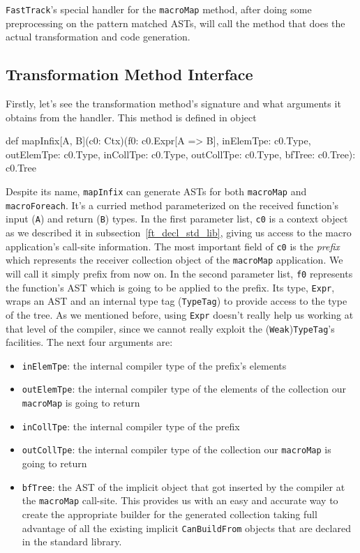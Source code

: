 \texttt{FastTrack}'s special handler for the \texttt{macroMap} method, after
doing some preprocessing on the pattern matched ASTs, will call the method
that does the actual transformation and code generation. 


\subsection{Transformation Method Interface}

Firstly, let's see the transformation method's signature and what arguments it
obtains from the handler. This method is defined in
 object 

\begin{scalaCode}
def mapInfix[A, B](c0: Ctx)(f0: c0.Expr[A => B], inElemTpe: c0.Type, outElemTpe: c0.Type, inCollTpe: c0.Type, outCollTpe: c0.Type, bfTree: c0.Tree): c0.Tree
\end{scalaCode}

Despite its name,
\texttt{mapInfix} can generate ASTs for both \texttt{macroMap} and \texttt{macroForeach}. It's a curried
method parameterized on the received function's input (\texttt{A}) and return (\texttt{B}) types.
In the first parameter list, \texttt{c0} is a context object as we described it in subsection~\ref{ft_decl_std_lib},
giving us access to the macro application's call-site information. The most
important field of \texttt{c0} is the \emph{prefix} which represents the receiver collection
object of the \texttt{macroMap} application. We will call it simply prefix
from now on. In the second parameter
list, \texttt{f0} represents the function's AST which is going to be applied to the
prefix. Its type, \texttt{Expr}, wraps an AST and an internal type tag
(\texttt{TypeTag}) to provide access to the type of the tree. As we mentioned
before, using \texttt{Expr} doesn't really help us working at that level of the
compiler, since we cannot really exploit the (\texttt{Weak})\texttt{TypeTag}'s facilities. The
next four arguments are:
\begin{itemize}
 \item
  \texttt{inElemTpe}: the internal compiler type of the prefix's elements
 \item
  \texttt{outElemTpe}: the internal compiler type of the elements of the collection our
\texttt{macroMap} is going to return
 \item
  \texttt{inCollTpe}: the internal compiler type of the prefix
 \item
  \texttt{outCollTpe}: the internal compiler type of the collection our \texttt{macroMap} is going
to return
 \item
  \texttt{bfTree}: the AST of the implicit   object that got
inserted by the compiler at the \texttt{macroMap} call-site. This provides us with an
easy and accurate way to create the appropriate builder for the generated
collection taking full advantage of all the existing implicit \texttt{CanBuildFrom} objects
that are declared in the standard library.
\end{itemize}

